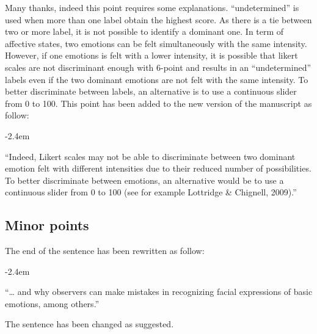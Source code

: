 \documentclass[]{article}
\renewenvironment{quote}{\begin{fquote}\advance\leftmargini -2.4em\begin{oldquote}}{\end{oldquote}\end{fquote}}
\newenvironment{fquote}
  {\def\FrameCommand{
	\fboxsep=0.6em %
	\fcolorbox{black}{white}}%
    \MakeFramed {\advance\hsize-2\width \FrameRestore}
    \begin{minipage}{\linewidth}
  }
  {\end{minipage}\endMakeFramed}
\begin{document}
Many thanks, indeed this point requires some explanations. ``undetermined'' is used when more than one label obtain the highest score. As there is a tie between two or more label, it is not possible to identify a dominant one. In term of affective states, two emotions can be felt simultaneously with the same intensity. However, if one emotions is felt with a lower intensity, it is possible that likert scales are not discriminant enough with 6-point and results in an ``undetermined'' labels even if the two dominant emotions are not felt with the same intensity. To better discriminate between labels, an alternative is to use a continuous slider from 0 to 100. This point has been added to the new version of the manuscript as follow:

\begin{quote}
``Indeed, Likert scales may not be able to discriminate between two dominant emotion felt with different intensities due to their reduced number of possibilities. To better discriminate between emotions, an alternative would be to use a continuous slider from 0 to 100 (see for example Lottridge \& Chignell, 2009).''
\end{quote}

\hypertarget{minor-points}{%
\subsection{Minor points}\label{minor-points}}


The end of the sentence has been rewritten as follow:

\begin{quote}
``\ldots{} and why observers can make mistakes in recognizing facial expressions of basic emotions, among others.''
\end{quote}


The sentence has been changed as suggested.

\end{document}
